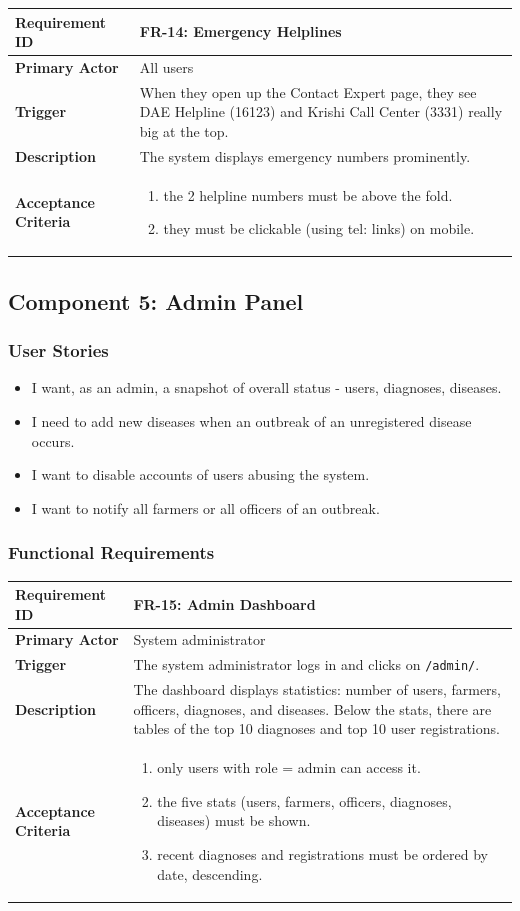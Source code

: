 \documentclass[12pt,a4paper]{article}
\newcommand{\frbox}[5]{%
  \begin{table}[H]
  \centering
  \begin{tabularx}{\textwidth}{|l|X|}
  \hline
  \rowcolor{lightgreen}
  \textbf{Requirement ID} & \textbf{#1} \\
  \hline
  \textbf{Primary Actor} & #2 \\
  \hline
  \textbf{Trigger} & #3 \\
  \hline
  \textbf{Description} & #4 \\
  \hline
  \rowcolor{lightgreen}
  \textbf{Acceptance Criteria} & #5 \\
  \hline
  \end{tabularx}
  \end{table}
}
\begin{document}
\frbox{FR-14: Emergency Helplines}
{All users}
{When they open up the Contact Expert page, they see DAE Helpline (16123) and Krishi Call Center (3331) really big at the top.}
{The system displays emergency numbers prominently.}
{%
\begin{enumerate}[leftmargin=1.5em, topsep=0pt]
  \item the 2 helpline numbers must be above the fold.
  \item they must be clickable (using tel: links) on mobile.
\end{enumerate}
}

\subsection{Component 5: Admin Panel}

\subsubsection*{User Stories}

\begin{itemize}[leftmargin=2em]
  \item I want, as an admin, a snapshot of overall status - users, diagnoses, diseases.
  \item I need to add new diseases when an outbreak of an unregistered disease occurs.
  \item I want to disable accounts of users abusing the system.
  \item I want to notify all farmers or all officers of an outbreak.
\end{itemize}

\subsubsection*{Functional Requirements}

\frbox{FR-15: Admin Dashboard}
{System administrator}
{The system administrator logs in and clicks on \texttt{/admin/}.}
{The dashboard displays statistics: number of users, farmers, officers, diagnoses, and diseases. Below the stats, there are tables of the top 10 diagnoses and top 10 user registrations.}
{%
\begin{enumerate}[leftmargin=1.5em, topsep=0pt]
  \item only users with role = admin can access it.
  \item the five stats (users, farmers, officers, diagnoses, diseases) must be shown.
  \item recent diagnoses and registrations must be ordered by date, descending.
\end{enumerate}
}
\end{document}
